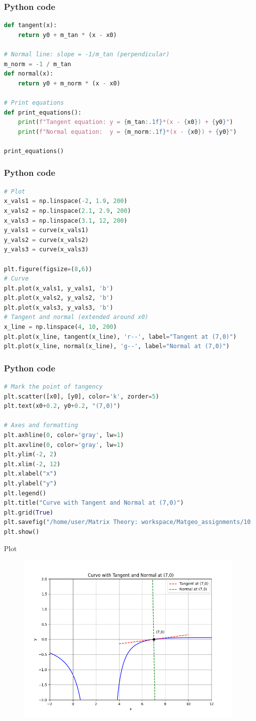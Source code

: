 \documentclass{beamer}
\begin{document}
\begin{frame}[fragile]
    \frametitle{Python code}
    \begin{lstlisting}[language=Python]
def tangent(x):
    return y0 + m_tan * (x - x0)

# Normal line: slope = -1/m_tan (perpendicular)
m_norm = -1 / m_tan
def normal(x):
    return y0 + m_norm * (x - x0)

# Print equations
def print_equations():
    print(f"Tangent equation: y = {m_tan:.1f}*(x - {x0}) + {y0}")
    print(f"Normal equation:  y = {m_norm:.1f}*(x - {x0}) + {y0}")

print_equations()

    \end{lstlisting}   
\end{frame}

\begin{frame}[fragile]
    \frametitle{Python code}
    \begin{lstlisting}[language=Python]
# Plot
x_vals1 = np.linspace(-2, 1.9, 200)
x_vals2 = np.linspace(2.1, 2.9, 200)
x_vals3 = np.linspace(3.1, 12, 200)
y_vals1 = curve(x_vals1)
y_vals2 = curve(x_vals2)
y_vals3 = curve(x_vals3)

plt.figure(figsize=(8,6))
# Curve
plt.plot(x_vals1, y_vals1, 'b')
plt.plot(x_vals2, y_vals2, 'b')
plt.plot(x_vals3, y_vals3, 'b')
# Tangent and normal (extended around x0)
x_line = np.linspace(4, 10, 200)
plt.plot(x_line, tangent(x_line), 'r--', label="Tangent at (7,0)")
plt.plot(x_line, normal(x_line), 'g--', label="Normal at (7,0)")
    \end{lstlisting}   
\end{frame}

\begin{frame}[fragile]
    \frametitle{Python code}
    \begin{lstlisting}[language=Python]
# Mark the point of tangency
plt.scatter([x0], [y0], color='k', zorder=5)
plt.text(x0+0.2, y0+0.2, "(7,0)")

# Axes and formatting
plt.axhline(0, color='gray', lw=1)
plt.axvline(0, color='gray', lw=1)
plt.ylim(-2, 2)
plt.xlim(-2, 12)
plt.xlabel("x")
plt.ylabel("y")
plt.legend()
plt.title("Curve with Tangent and Normal at (7,0)")
plt.grid(True)
plt.savefig("/home/user/Matrix Theory: workspace/Matgeo_assignments/10.4.2/figs/Figure_1.png")
plt.show()
    \end{lstlisting}   
\end{frame}

\begin{frame}{Plot}
    \begin{figure}[H]
    \centering
    \includegraphics[width=0.6\columnwidth]{figs/Figure_1.png}
    \label{fig:1}
\end{figure}
\end{frame}
\end{document}
